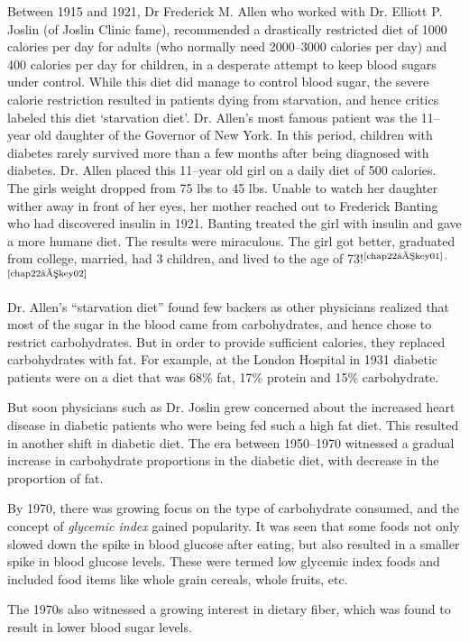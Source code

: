 Between 1915 and 1921, Dr Frederick M. Allen who worked with Dr. Elliott P. Joslin (of Joslin Clinic fame), recommended a drastically restricted diet of 1000 calories per day for adults (who normally need 2000–3000 calories per day) and 400 calories per day for children, in a desperate attempt to keep blood sugars under control. While this diet did manage to control blood sugar, the severe calorie restriction resulted in patients dying from starvation, and hence critics labeled this diet ‘starvation diet’. Dr. Allen’s most famous patient was the 11–year old daughter of the Governor of New York. In this period, children with diabetes rarely survived more than a few months after being diagnosed with diabetes. Dr. Allen placed this 11–year old girl on a daily diet of 500 calories. The girls weight dropped from 75 lbs to 45 lbs. Unable to watch her daughter wither away in front of her eyes, her mother reached out to Frederick Banting who had discovered insulin in 1921. Banting treated the girl with insulin and gave a more humane diet. The results were miraculous. The girl got better, graduated from college, married, had 3 children, and lived to the age of 73!$^{\text{\cite{chap22–key01}}}$$^,$$^{\text{\cite{chap22–key02}}}$

Dr. Allen’s “starvation diet” found few backers as other physicians realized that most of the sugar in the blood came from carbohydrates, and hence chose to restrict carbohydrates. But in order to provide sufficient calories, they replaced carbohydrates with fat. For example, at the London Hospital in 1931 diabetic patients were on a diet that was 68\% fat, 17\% protein and 15\% carbohydrate.

But soon physicians such as Dr. Joslin grew concerned about the increased heart disease in diabetic patients who were being fed such a high fat diet. This resulted in another shift in diabetic diet. The era between 1950–1970 witnessed a gradual increase in carbohydrate proportions in the diabetic diet, with decrease in the proportion of fat.

By 1970, there was growing focus on the type of carbohydrate consumed, and the concept of \textit{glycemic index} gained popularity. It was seen that some foods not only slowed down the spike in blood glucose after eating, but also resulted in a smaller spike in blood glucose levels. These were termed low glycemic index foods and included food items like whole grain cereals, whole fruits, etc.

The 1970s also witnessed a growing interest in dietary fiber, which was found to result in lower blood sugar levels.

